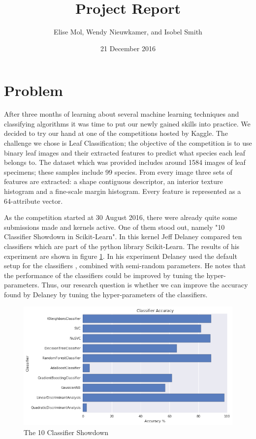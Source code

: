 \documentclass{article}
\title {Project Report}
\date{21 December 2016}
\author{Elise Mol, Wendy Nieuwkamer, and Isobel Smith}
\begin{document}
\maketitle

\section{Problem}

After three months of learning about several machine learning techniques and classifying algorithms it was time to put our newly gained skills into practice. We decided to try our hand at one of the competitions hosted by Kaggle. The challenge we chose is Leaf Classification; the objective of the competition is to use binary leaf images and their extracted features to predict what species each leaf belongs to. The dataset which was provided includes around 1584 images of leaf specimens; these samples include 99 species. From every image three sets of features are extracted: a shape contiguous descriptor, an interior texture histogram and a fine-scale margin histogram. Every feature is represented as a 64-attribute vector. 

As the competition started at 30 August 2016, there were already quite some submissions made and kernels active. One of them stood out, namely "10 Classifier Showdown in Scikit-Learn". In this kernel Jeff Delaney compared ten classifiers which are part of the python library Scikit-Learn. The results of his experiment are shown in figure \ref{fig:showdown}. In his experiment Delaney used the default setup for the classifiers , combined with semi-random parameters. He notes that the performance of the classifiers could be improved by tuning the hyper-parameters. Thus, our research question is whether we can improve the accuracy found by Delaney by tuning the hyper-parameters of the classifiers.

\begin{figure} 
	\includegraphics[width=\linewidth]{results-showdown.png}
	\caption{The 10 Classifier Showdown}
	\label{fig:showdown}
\end{figure}
\end{document}
